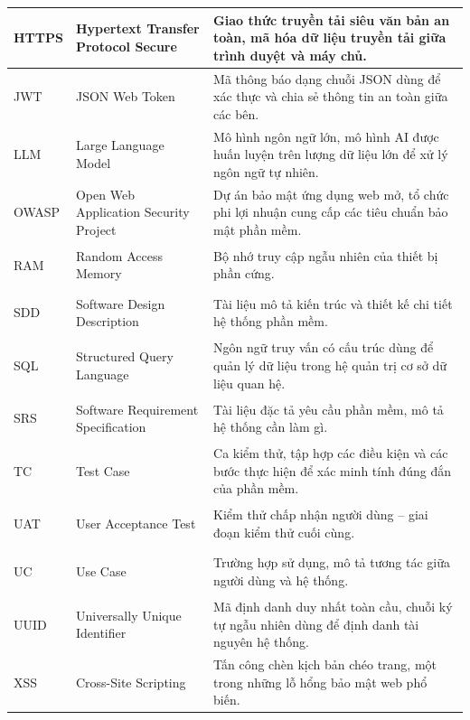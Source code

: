 \begin{longtable}{|>{\bfseries\raggedright\arraybackslash}p{1.5cm}|>{\raggedright\arraybackslash}p{4.5cm}|>{\raggedright\arraybackslash}p{7.5cm}|}
  HTTPS & Hypertext Transfer Protocol Secure &
         Giao thức truyền tải siêu văn bản an toàn, mã hóa dữ liệu truyền tải giữa trình duyệt và máy chủ. \\ \hline
  JWT   & JSON Web Token &
         Mã thông báo dạng chuỗi JSON dùng để xác thực và chia sẻ thông tin an toàn giữa các bên. \\ \hline
  LLM   & Large Language Model &
         Mô hình ngôn ngữ lớn, mô hình AI được huấn luyện trên lượng dữ liệu lớn để xử lý ngôn ngữ tự nhiên. \\ \hline
  OWASP & Open Web Application Security Project &
         Dự án bảo mật ứng dụng web mở, tổ chức phi lợi nhuận cung cấp các tiêu chuẩn bảo mật phần mềm. \\ \hline
  RAM   & Random Access Memory &
         Bộ nhớ truy cập ngẫu nhiên của thiết bị phần cứng. \\ \hline
  SDD   & Software Design Description &
         Tài liệu mô tả kiến trúc và thiết kế chi tiết hệ thống phần mềm. \\ \hline
  SQL   & Structured Query Language &
         Ngôn ngữ truy vấn có cấu trúc dùng để quản lý dữ liệu trong hệ quản trị cơ sở dữ liệu quan hệ. \\ \hline
  SRS   & Software Requirement Specification &
         Tài liệu đặc tả yêu cầu phần mềm, mô tả hệ thống cần làm gì. \\ \hline
  TC    & Test Case &
         Ca kiểm thử, tập hợp các điều kiện và các bước thực hiện để xác minh tính đúng đắn của phần mềm. \\ \hline
  UAT   & User Acceptance Test &
         Kiểm thử chấp nhận người dùng -- giai đoạn kiểm thử cuối cùng. \\ \hline
  UC    & Use Case &
         Trường hợp sử dụng, mô tả tương tác giữa người dùng và hệ thống. \\ \hline
  UUID  & Universally Unique Identifier &
         Mã định danh duy nhất toàn cầu, chuỗi ký tự ngẫu nhiên dùng để định danh tài nguyên hệ thống. \\ \hline
  XSS   & Cross-Site Scripting &
         Tấn công chèn kịch bản chéo trang, một trong những lỗ hổng bảo mật web phổ biến. \\ \hline
\end{longtable}